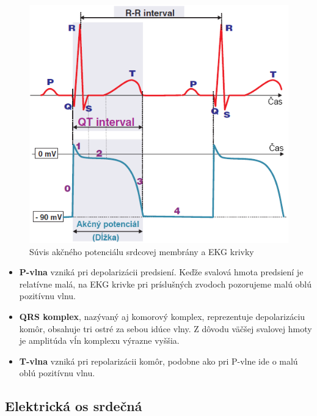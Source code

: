 \begin{figure}[H]
    \centering
    \includegraphics[scale=0.45]{img/action-potential-duration.png}
    \caption{Súvis akčného potenciálu srdcovej membrány a EKG krivky\cite{Blahút_2017}}
    \label{fig:action_potential_duration}
\end{figure}

\begin{itemize}
    \item \textbf{P-vlna} vzniká pri depolarizácii predsiení. Keďže svalová hmota predsiení je relatívne malá, na EKG krivke pri príslušných zvodoch pozorujeme malú oblú pozitívnu vlnu.
    \item \textbf{QRS komplex}, nazývaný aj komorový komplex, reprezentuje depolarizáciu komôr, obsahuje tri ostré za sebou idúce vlny. Z dôvodu väčšej svalovej hmoty je amplitúda vĺn komplexu výrazne vyššia. 
    \item \textbf{T-vlna} vzniká pri repolarizácii komôr, podobne ako pri P-vlne ide o malú oblú pozitívnu vlnu.\cite{Foster_2007}\cite{Bada2010}
\end{itemize}

\subsection{Elektrická os srdečná}

